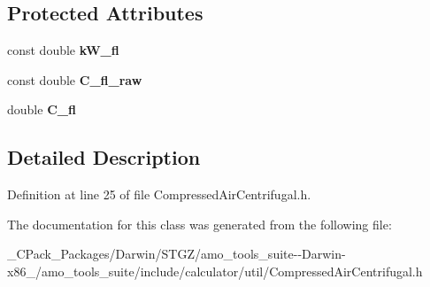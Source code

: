\subsection*{Protected Attributes}
\begin{DoxyCompactItemize}
\item 
\mbox{\label{class_compressed_air_centrifugal_base_a68a8687d51ac29f4660b46a329c6ca95}} 
const double {\bfseries k\+W\+\_\+fl}
\item 
\mbox{\label{class_compressed_air_centrifugal_base_a592b04334bdfc2814db8a3cb2079c124}} 
const double {\bfseries C\+\_\+fl\+\_\+raw}
\item 
\mbox{\label{class_compressed_air_centrifugal_base_af7b670edb68bbc077472bd577ce1cfd4}} 
double {\bfseries C\+\_\+fl}
\end{DoxyCompactItemize}


\subsection{Detailed Description}


Definition at line 25 of file Compressed\+Air\+Centrifugal.\+h.



The documentation for this class was generated from the following file\+:\begin{DoxyCompactItemize}
\item 
\+\_\+\+C\+Pack\+\_\+\+Packages/\+Darwin/\+S\+T\+G\+Z/amo\+\_\+tools\+\_\+suite-\/-\/\+Darwin-\/x86\+\_/amo\+\_\+tools\+\_\+suite/include/calculator/util/Compressed\+Air\+Centrifugal.\+h\end{DoxyCompactItemize}
